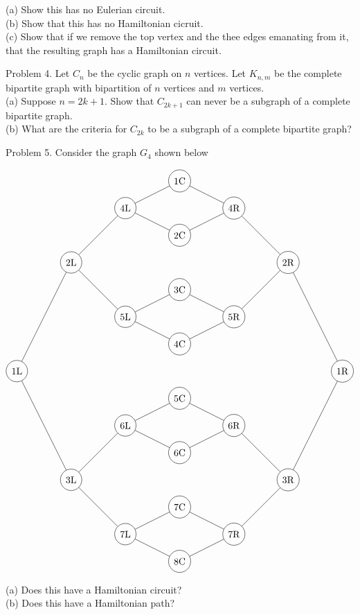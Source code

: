 \documentclass[16 pt]{amsart}
\theoremstyle{definition}
\theoremstyle{remark}
\numberwithin{equation}{subsection}
\begin{document}
(a) Show this has no Eulerian circuit.\\

(b) Show that this has no Hamiltonian cicruit.\\

(c) Show that if we remove the top vertex and the thee edges emanating from it, that the resulting graph has a Hamiltonian circuit.

\newpage

Problem 4.  Let $C_n$ be the cyclic graph on $n$ vertices.  Let $K_{n,m}$ be the complete bipartite graph with bipartition of $n$ vertices and $m$ vertices.\\

(a) Suppose $n=2k+1$.  Show that $C_{2k+1}$ can never be a subgraph of a complete bipartite graph.\\

(b) What are the criteria for $C_{2k}$ to be a subgraph of a complete bipartite graph?

\newpage

Problem 5. Consider the graph $G_4$ shown below

\[
\begin{tikzpicture}
\node[circle,draw](1L) at (-3,0){1L};
\node[circle,draw](2L) at (-1,4){2L};
\node[circle,draw](3L) at (-1,-4){3L};
\node[circle,draw](4L) at (1,6){4L};
\node[circle,draw](5L) at (1,2){5L};
\node[circle,draw](6L) at (1,-2){6L};
\node[circle,draw](7L) at (1,-6){7L};
\node[circle,draw](1R) at (9,0){1R};
\node[circle,draw](2R) at (7,4){2R};
\node[circle,draw](3R) at (7,-4){3R};
\node[circle,draw](4R) at (5,6){4R};
\node[circle,draw](5R) at (5,2){5R};
\node[circle,draw](6R) at (5,-2){6R};
\node[circle,draw](7R) at (5,-6){7R};
\node[circle,draw](1C) at (3,7){1C};
\node[circle,draw](2C) at (3,5){2C};
\node[circle,draw](3C) at (3,3){3C};
\node[circle,draw](4C) at (3,1){4C};
\node[circle,draw](5C) at (3,-1){5C};
\node[circle,draw](6C) at (3,-3){6C};
\node[circle,draw](7C) at (3,-5){7C};
\node[circle,draw](8C) at (3,-7){8C};
\foreach \from/\to in {1L/2L,1L/3L,2L/4L,2L/5L,3L/6L,3L/7L,1R/2R,1R/3R,2R/4R,2R/5R,3R/6R,3R/7R,1C/4L,1C/4R,2C/4L,2C/4R,3C/5L,3C/5R,4C/5L,4C/5R,5C/6L,5C/6R,6C/6L,6C/6R,7C/7L,7C/7R,8C/7L,8C/7R}
\draw (\from)--(\to);
\end{tikzpicture}
\]

(a) Does this have a Hamiltonian circuit?\\

(b) Does this have a Hamiltonian path?\\
\end{document}
